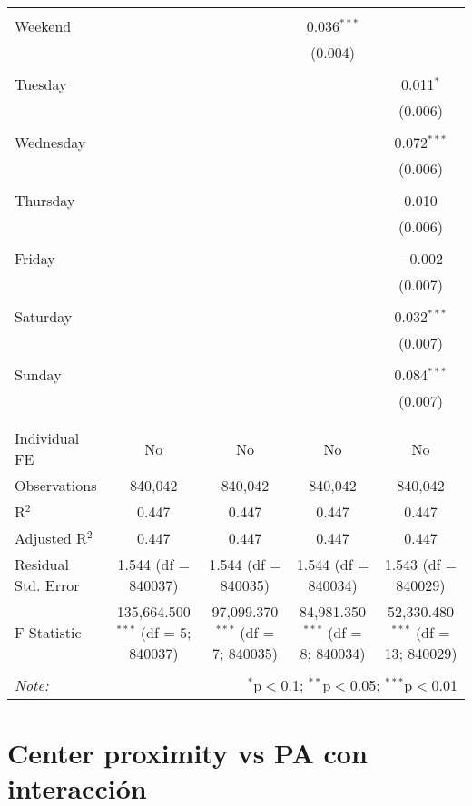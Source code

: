 \documentclass[
]{article}
\begin{document}
\begin{table}[!htbp]
{\begin{tabular}{@{\extracolsep{5pt}}lcccc}
  & & & & \\ 
 Weekend &  &  & 0.036$^{***}$ &  \\ 
  &  &  & (0.004) &  \\ 
  & & & & \\ 
 Tuesday &  &  &  & 0.011$^{*}$ \\ 
  &  &  &  & (0.006) \\ 
  & & & & \\ 
 Wednesday &  &  &  & 0.072$^{***}$ \\ 
  &  &  &  & (0.006) \\ 
  & & & & \\ 
 Thursday &  &  &  & 0.010 \\ 
  &  &  &  & (0.006) \\ 
  & & & & \\ 
 Friday &  &  &  & $-$0.002 \\ 
  &  &  &  & (0.007) \\ 
  & & & & \\ 
 Saturday &  &  &  & 0.032$^{***}$ \\ 
  &  &  &  & (0.007) \\ 
  & & & & \\ 
 Sunday &  &  &  & 0.084$^{***}$ \\ 
  &  &  &  & (0.007) \\ 
  & & & & \\ 
\hline \\[-1.8ex] 
Individual FE & No & No & No & No \\ 
Observations & 840,042 & 840,042 & 840,042 & 840,042 \\ 
R$^{2}$ & 0.447 & 0.447 & 0.447 & 0.447 \\ 
Adjusted R$^{2}$ & 0.447 & 0.447 & 0.447 & 0.447 \\ 
Residual Std. Error & 1.544 (df = 840037) & 1.544 (df = 840035) & 1.544 (df = 840034) & 1.543 (df = 840029) \\ 
F Statistic & 135,664.500$^{***}$ (df = 5; 840037) & 97,099.370$^{***}$ (df = 7; 840035) & 84,981.350$^{***}$ (df = 8; 840034) & 52,330.480$^{***}$ (df = 13; 840029) \\ 
\hline 
\hline \\[-1.8ex] 
\textit{Note:}  & \multicolumn{4}{r}{$^{*}$p$<$0.1; $^{**}$p$<$0.05; $^{***}$p$<$0.01} \\ 
\end{tabular}
} 
\end{table} 
\newpage
\section{Center proximity vs PA con interacción}
\end{document}
